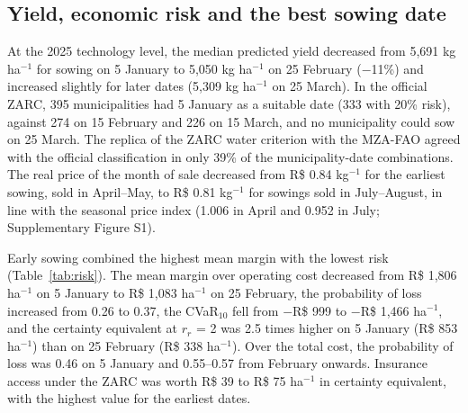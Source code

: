 \documentclass[10pt,a4paper]{article}
\begin{document}
\subsection{Yield, economic risk and the best sowing date}
\label{subsec:res_risk}

At the 2025 technology level, the median predicted yield decreased from 5,691 kg ha$^{-1}$ for sowing on
5 January to 5,050 kg ha$^{-1}$ on 25 February ($-$11\%) and increased slightly for later dates (5,309 kg
ha$^{-1}$ on 25 March). In the official ZARC, 395 municipalities had 5 January as a suitable date (333 with
20\% risk), against 274 on 15 February and 226 on 15 March, and no municipality could sow on 25 March. The
replica of the ZARC water criterion with the MZA-FAO agreed with the official classification in only 39\%
of the municipality-date combinations. The real price of the month of sale decreased from R\$ 0.84 kg$^{-1}$
for the earliest sowing, sold in April--May, to R\$ 0.81 kg$^{-1}$ for sowings sold in July--August, in
line with the seasonal price index (1.006 in April and 0.952 in July; Supplementary Figure S1).

Early sowing combined the highest mean margin with the lowest risk (Table~\ref{tab:risk}). The mean
margin over operating cost decreased from R\$ 1,806 ha$^{-1}$ on 5 January to R\$ 1,083 ha$^{-1}$ on
25 February, the probability of loss increased from 0.26 to 0.37, the CVaR$_{10}$ fell from $-$R\$ 999
to $-$R\$ 1,466 ha$^{-1}$, and the certainty equivalent at $r_r$ = 2 was 2.5 times higher on 5 January
(R\$ 853 ha$^{-1}$) than on 25 February (R\$ 338 ha$^{-1}$). Over the total cost, the probability of loss
was 0.46 on 5 January and 0.55--0.57 from February onwards. Insurance access under the ZARC was worth
R\$ 39 to R\$ 75 ha$^{-1}$ in certainty equivalent, with the highest value for the earliest dates.
\end{document}
